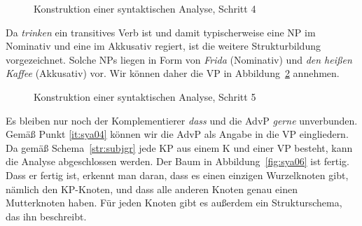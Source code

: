 \begin{figure}[!htbp]
  \caption{Konstruktion einer syntaktischen Analyse, Schritt 4}
  \label{fig:sya04}
\end{figure}

Da \textit{trinken} ein transitives Verb ist und damit typischerweise eine NP im Nominativ und eine im Akkusativ regiert, ist die weitere Strukturbildung vorgezeichnet.
Solche NPs liegen in Form von \textit{Frida} (Nominativ) und \textit{den heißen Kaffee} (Akkusativ) vor.
Wir können daher die VP in Abbildung~\ref{fig:sya05} annehmen.

\begin{figure}[!htbp]
  \caption{Konstruktion einer syntaktischen Analyse, Schritt 5}
  \label{fig:sya05}
\end{figure}

Es bleiben nur noch der Komplementierer \textit{dass} und die AdvP \textit{gerne} unverbunden.
Gemäß Punkt \ref{it:sya04} können wir die AdvP als Angabe in die VP eingliedern.
Da gemäß Schema~\ref{str:subjgr} jede KP aus einem K und einer VP besteht, kann die Analyse abgeschlossen werden.
Der Baum in Abbildung~\ref{fig:sya06} ist fertig.
Dass er fertig ist, erkennt man daran, dass es einen einzigen Wurzelknoten gibt, nämlich den KP-Knoten, und dass alle anderen Knoten genau einen Mutterknoten haben.
Für jeden Knoten gibt es außerdem ein Strukturschema, das ihn beschreibt.

